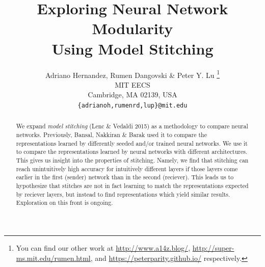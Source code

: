 \documentclass{article} %
\title{Exploring Neural Network Modularity \\ Using Model Stitching}
\author{Adriano Hernandez, Rumen Dangovski \& Peter Y. Lu \thanks{You can find our other work at \url{http://www.a14z.blog/}, \url{http://super-ms.mit.edu/rumen.html}, and \url{https://peterparity.github.io/} respectively.} \\
MIT EECS\\
Cambridge, MA 02139, USA \\
\texttt{\{adrianoh,rumenrd,lup\}@mit.edu}
}
\begin{document}
\maketitle

\begin{abstract}
We expand \textit{model stitching} (Lenc \& Vedaldi 2015) as a methodology to compare neural networks.
Previously, Bansal, Nakkiran \& Barak used it to compare the representations learned by differently seeded and/or trained neural networks.
We use it to compare the representations learned by neural networks with different architectures.
This gives us insight into the properties of stitching. Namely, we find that stitching can reach unintuitively
high accuracy for intuitively different layers if those layers come earlier in the first (sender) network than in
the second (reciever). This leads us to hypothesize that stitches are not in fact learning to match the
representations expected by reciever layers, but instead to find representations which yield similar results.
Exploration on this front is ongoing.
\end{abstract}
\end{document}
